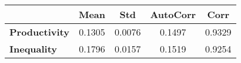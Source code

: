 \begin{tiny}\begin{tabular}{|l|c|c|c|c|}
\hline
&\textbf{Mean}&\textbf{Std}&\textbf{AutoCorr}&\textbf{Corr}\\\hline
\textbf{Productivity}&0.1305&0.0076&0.1497&0.9329\\\hline
\textbf{Inequality}&0.1796&0.0157&0.1519&0.9254\\\hline
\end{tabular}
\end{tiny}